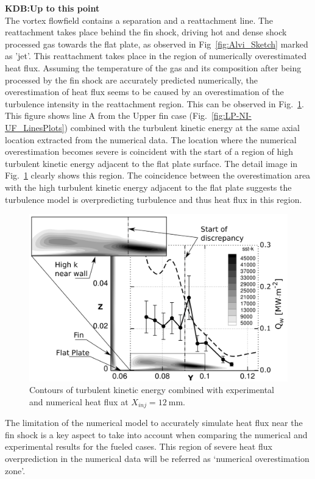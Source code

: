 \documentclass{AIAA}
\begin{document}
\textbf{KDB:Up to this point}\hfill\\
The vortex flowfield contains a separation and a reattachment line.
The reattachment takes place behind the fin shock, driving hot and dense shock processed gas towards the flat plate, as observed in Fig~\ref{fig:Alvi_Sketch} marked as 'jet'.
This reattachment takes place in the region of numerically overestimated heat flux. 
Assuming the temperature of the gas and its composition after being processed by the fin shock are accurately predicted numerically, the overestimation of heat flux seems to be caused by an overestimation of the turbulence intensity in the reattachment region.
This can be observed in Fig.~\ref{fig:SSTk_Q_Combi}.
This figure shows line A from the Upper fin case (Fig.~\ref{fig:LP-NI-UF_LinesPlots}) combined with the turbulent kinetic energy at the same axial location extracted from the numerical data.
The location where the numerical overestimation becomes severe is coincident with the start of a region of high turbulent kinetic energy adjacent to the flat plate surface.
The detail image in Fig.~\ref{fig:SSTk_Q_Combi} clearly shows this region.
The coincidence between the overestimation area with the high turbulent kinetic energy adjacent to the flat plate suggests the turbulence model is overpredicting turbulence and thus heat flux in this region.


%
\begin{figure}[!h]
\center
\includegraphics[width=0.70\columnwidth,valign=t]{Figures/SST-K_X137_LP_NI_UF_Q_and_SSTk_Combined.pdf}
\caption{Contours of turbulent kinetic energy combined with experimental and numerical heat flux at $X_{inj} = \SI{12}{\milli\meter}$.}
\label{fig:SSTk_Q_Combi}
\end{figure} 



The limitation of the numerical model to accurately simulate heat flux near the fin shock is a key aspect to take into account when comparing the numerical and experimental results for the fueled cases. 
This region of severe heat flux overprediction in the numerical data will be referred as `numerical overestimation zone'.
\end{document}
